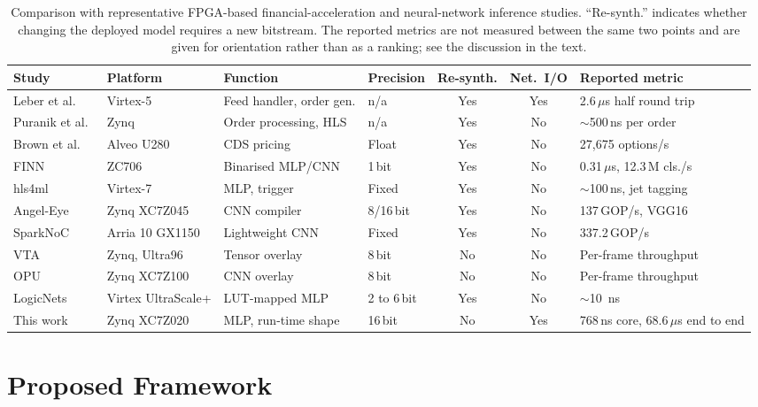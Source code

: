 \documentclass[final,5p,times,twocolumn]{elsarticle}
\begin{document}
\begin{table}[t]
\centering
\caption{Comparison with representative FPGA-based financial-acceleration and
neural-network inference studies. ``Re-synth.'' indicates whether changing the
deployed model requires a new bitstream. The reported metrics are not measured
between the same two points and are given for orientation rather than as a
ranking; see the discussion in the text.}
\label{tab:related_work}
\small
\begin{tabular}{@{}L{2.0cm}L{2.0cm}L{2.4cm}L{1.2cm}ccL{2.4cm}@{}}
\toprule
Study & Platform & Function & Precision & Re-synth. & Net.\ I/O & Reported metric \\
\midrule
Leber et al.~\cite{Leber2011} & Virtex-5 & Feed handler, order gen. & n/a & Yes & Yes & 2.6\,$\mu$s half round trip \\
Puranik et al.~\cite{Puranik2023} & Zynq & Order processing, HLS & n/a & Yes & No & $\sim$500\,ns per order \\
Brown et al.~\cite{Brown2021} & Alveo U280 & CDS pricing & Float & Yes & No & 27{,}675 options/s \\
FINN~\cite{Umuroglu2017} & ZC706 & Binarised MLP/CNN & 1\,bit & Yes & No & 0.31\,$\mu$s, 12.3\,M cls./s \\
hls4ml~\cite{Duarte2018} & Virtex-7 & MLP, trigger & Fixed & Yes & No & $\sim$100\,ns, jet tagging \\
Angel-Eye~\cite{Guo2018} & Zynq XC7Z045 & CNN compiler & 8/16\,bit & Yes & No & 137\,GOP/s, VGG16 \\
SparkNoC~\cite{sparknoc} & Arria 10 GX1150 & Lightweight CNN & Fixed & Yes & No & 337.2\,GOP/s \\
\addlinespace
VTA~\cite{Moreau2019} & Zynq, Ultra96 & Tensor overlay & 8\,bit & No & No & Per-frame throughput \\
OPU~\cite{Yu2020} & Zynq XC7Z100 & CNN overlay & 8\,bit & No & No & Per-frame throughput \\
LogicNets~\cite{Umuroglu2020} & Virtex Ultra\-Scale+ & LUT-mapped MLP & 2 to 6\,bit & Yes & No & $\sim$\SI{10}{\nano\second} \\
\addlinespace
This work & Zynq XC7Z020 & MLP, run-time shape & 16\,bit & No & Yes & 768\,ns core, 68.6\,$\mu$s end to end \\
\bottomrule
\end{tabular}
\end{table}

\section{Proposed Framework}
\label{sec:framework}
\end{document}
